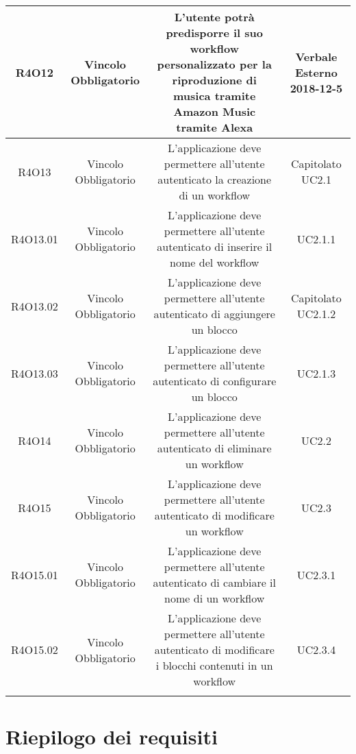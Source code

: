 \begin{tabularx}{\textwidth}{|C|C|C|C|}
	\hline
	R4O12&Vincolo Obbligatorio&L'utente potrà predisporre il suo workflow personalizzato per la riproduzione di musica tramite Amazon Music tramite Alexa& Verbale Esterno 2018-12-5 \\
	\hline
	R4O13&Vincolo Obbligatorio&L'applicazione deve permettere all'utente autenticato la creazione di un workflow& Capitolato UC2.1\\
	\hline
	R4O13.01&Vincolo Obbligatorio& L'applicazione deve permettere all'utente autenticato di inserire il nome del workflow  & UC2.1.1\\
	\hline
	R4O13.02&Vincolo Obbligatorio&L'applicazione deve permettere all'utente autenticato di aggiungere un blocco & Capitolato UC2.1.2\\
	\hline	
	R4O13.03&Vincolo Obbligatorio&L'applicazione deve permettere all'utente autenticato di configurare un blocco&UC2.1.3\\
	\hline
	R4O14&Vincolo Obbligatorio&L'applicazione deve permettere all'utente autenticato di eliminare un workflow&UC2.2\\
	\hline
	R4O15&Vincolo Obbligatorio& L'applicazione deve permettere all'utente autenticato di  modificare un workflow  &UC2.3\\
	\hline
	R4O15.01&Vincolo Obbligatorio& L'applicazione deve permettere all'utente autenticato di cambiare il nome di un workflow  &UC2.3.1\\
	\hline
	R4O15.02&Vincolo Obbligatorio& L'applicazione deve permettere all'utente autenticato di modificare i blocchi contenuti in un workflow  &UC2.3.4\\
	\hline
	\caption{Tabella requisiti di vincolo}
\end{tabularx}

\section{Riepilogo dei requisiti}
\newpage
